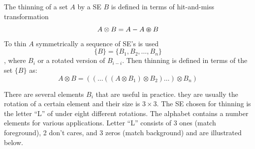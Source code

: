 \documentclass[a4paper]{article}
\begin{document}
\begin{definition}
The thinning of a set $A$ by a SE $B$ is defined in terms of hit-and-miss transformation
\begin{equation}
    A \otimes B = A - A \varoast B
\end{equation}
To thin $A$ symmetrically a sequence of SE's is used
\begin{equation}
    \{ B \} = \{ B_1, B_2,\ldots , B_n \}
\end{equation}
, where $B_i$ or a rotated version of $B_{i-i}$. Then thinning is defined in terms of the set $\{ B\}$ as:
\begin{equation}
    A\otimes B = \left( \left( \ldots \left(  \left( A \otimes B_1\right) \otimes B_2 \right)\ldots\right) \otimes B_n \right)
\end{equation}
\end{definition}

There are several elements $B_i$ that are useful in practice. they are usually the rotation of a certain element and their size is $3\times 3$. The SE chosen for thinning is the letter ``L'' of  under eight different rotations. The alphabet contains a number elements for various applications. Letter ``L'' consists of 3 ones (match foreground), 2 don't cares, and 3 zeros (match background) and are illustrated below.
\end{document}
